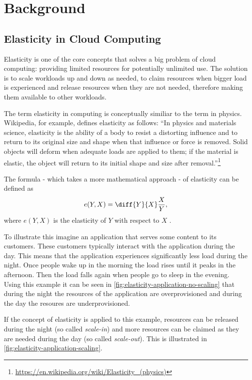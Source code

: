 \chapter{Background}
\label{ch:background}
\section{Elasticity in Cloud Computing}

Elasticity is one of the core concepts that solves a big problem of cloud computing: providing limited resources for potentially unlimited use. The solution is to scale workloads up and down as needed, to claim resources when bigger load is experienced and release resources when they are not needed, therefore making them available to other workloads.

The term elasticity in computing is conceptually similiar to the term in physics. Wikipedia, for example, defines elasticity as follows: ``In physics and materials science, elasticity is the ability of a body to resist a distorting influence and to return to its original size and shape when that influence or force is removed. Solid objects will deform when adequate loads are applied to them; if the material is elastic, the object will return to its initial shape and size after removal.''\footnote{\url{https://en.wikipedia.org/wiki/Elasticity_(physics)}}


The formula - which takes a more mathematical approach - of elasticity can be defined as \[ e(Y, X) = \diff{Y}{X} \frac{X}{Y}, \] where \(e(Y, X)\) is the elasticity of \(Y\) with respect to \(X\) \cite{dustdarPrinciplesElasticProcesses2011}.

To illustrate this imagine an application that serves some content to its customers. These customers typically interact with the application during the day. This means that the application experiences significantly less load during the night. Once people wake up in the morning the load rises until it peaks in the afternoon. Then the load falls again when people go to sleep in the evening. Using this example it can be seen in \cref{fig:elasticity-application-no-scaling} that during the night the resources of the application are overprovisioned and during the day the resoures are underprovisioned.

If the concept of elasticity is applied to this example, resources can be released during the night (so called \textit{scale-in}) and more resources can be claimed as they are needed during the day (so called \textit{scale-out}). This is illustrated in \cref{fig:elasticity-application-scaling}.

